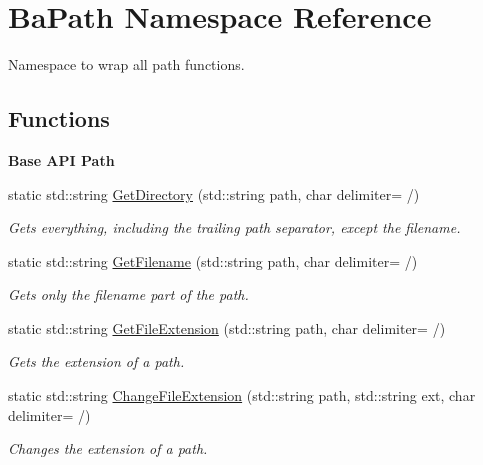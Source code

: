 \hypertarget{namespaceBaPath}{}\section{Ba\+Path Namespace Reference}
\label{namespaceBaPath}


Namespace to wrap all path functions.  


\subsection*{Functions}
\begin{Indent}{\bf Base A\+PI Path}\par
\begin{DoxyCompactItemize}
\item 
static std\+::string \hyperlink{namespaceBaPath_aee6b101395e5f32a76b304aa765de13c}{Get\+Directory} (std\+::string path, char delimiter= \textquotesingle{}/\textquotesingle{})
\begin{DoxyCompactList}\small\item\em Gets everything, including the trailing path separator, except the filename. \end{DoxyCompactList}\item 
static std\+::string \hyperlink{namespaceBaPath_a41d87786f4a43d64094624187ac90dca}{Get\+Filename} (std\+::string path, char delimiter= \textquotesingle{}/\textquotesingle{})
\begin{DoxyCompactList}\small\item\em Gets only the filename part of the path. \end{DoxyCompactList}\item 
static std\+::string \hyperlink{namespaceBaPath_a42b3acac9c048e45a531c9dc4be319f1}{Get\+File\+Extension} (std\+::string path, char delimiter= \textquotesingle{}/\textquotesingle{})
\begin{DoxyCompactList}\small\item\em Gets the extension of a path. \end{DoxyCompactList}\item 
static std\+::string \hyperlink{namespaceBaPath_a70f965f0c97d211e1f91dc2f16e05195}{Change\+File\+Extension} (std\+::string path, std\+::string ext, char delimiter= \textquotesingle{}/\textquotesingle{})
\begin{DoxyCompactList}\small\item\em Changes the extension of a path. \end{DoxyCompactList}\end{DoxyCompactItemize}
\end{Indent}


